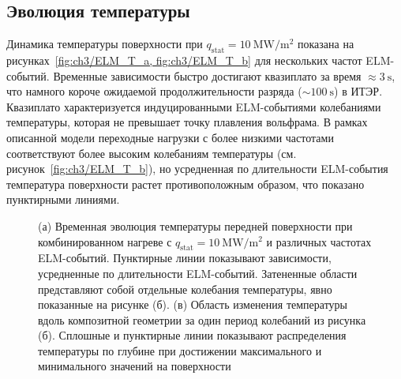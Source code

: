 \subsection{Эволюция температуры}\label{subsec:ch3/sec2/subsec3}
Динамика температуры поверхности при $q_{\mathrm{stat}}=\SI{10}{\mega\watt\per\meter\squared}$ показана на рисунках~\cref{fig:ch3/ELM_T_a, fig:ch3/ELM_T_b} для нескольких частот ELM-событий. Временные зависимости быстро достигают квазиплато за время $\approx\SI{3}{\second}$, что намного короче ожидаемой продолжительности разряда ($\sim\SI{100}{\second}$) в ИТЭР. Квазиплато характеризуется индуцированными ELM-событиями колебаниями температуры, которая не превышает точку плавления вольфрама. В рамках описанной модели переходные нагрузки с более низкими частотами соответствуют более высоким колебаниям температуры (см. рисунок~\cref{fig:ch3/ELM_T_b}), но усредненная по длительности ELM-события температура поверхности растет противоположным образом, что показано пунктирными линиями.

\begin{figure}[ht]
	\caption{(а) Временная эволюция температуры передней поверхности при комбинированном нагреве с $q_{\mathrm{stat}}=\SI{10}{\mega\watt\per\meter\squared}$ и различных частотах ELM-событий. Пунктирные линии показывают зависимости, усредненные по длительности ELM-событий. Затененные области представляют собой отдельные колебания температуры, явно показанные на рисунке (б). (в) Область изменения температуры вдоль композитной геометрии за один период колебаний из рисунка (б). Сплошные и пунктирные линии показывают распределения температуры по глубине при достижении максимального и минимального значений на поверхности}
\end{figure}

